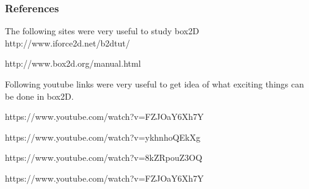 \documentclass{beamer}
\begin{document}
\begin{frame}
\frametitle{References}
    The following sites were very useful to study box2D
http://www.iforce2d.net/b2dtut/

http://www.box2d.org/manual.html

Following youtube links were very useful to get idea of what exciting things can be done in box2D.

https://www.youtube.com/watch?v=FZJOaY6Xh7Y

https://www.youtube.com/watch?v=ykhnhoQEkXg

https://www.youtube.com/watch?v=8kZRpouZ3OQ

https://www.youtube.com/watch?v=FZJOaY6Xh7Y
	
    
    
\end{frame}


 
\end{document}

